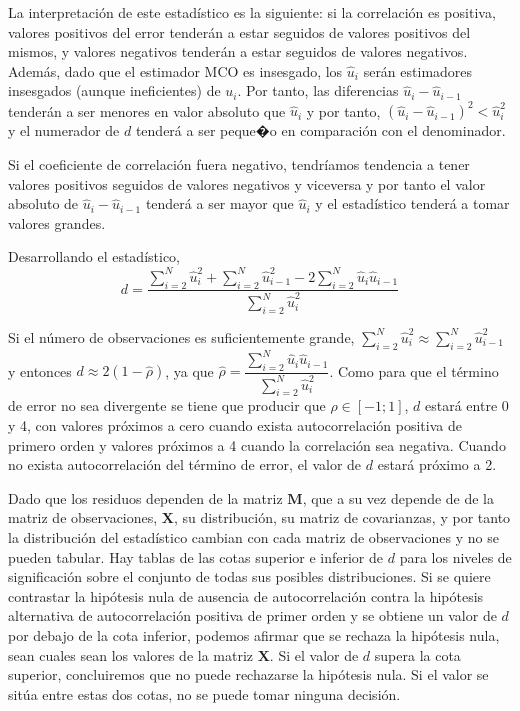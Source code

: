 La interpretaci\'on de este estad\'istico es la siguiente: si la correlaci\'on
es positiva, valores positivos del error tender\'an a estar seguidos
de valores positivos del mismos, y valores negativos tender\'an a estar
seguidos de valores negativos. Adem\'as, dado que el estimador MCO es
insesgado, los $\hat{u}_{i}$ ser\'an estimadores insesgados (aunque
ineficientes) de $u_{i}$. Por tanto, las diferencias $\hat{u}_{i}-\hat{u}_{i-1}$
tender\'an a ser menores en valor absoluto que $\hat{u}_{i}$ y por
tanto, $\left(\hat{u}_{i}-\hat{u}_{i-1}\right)^{2}<\hat{u}_{i}^{2}$
y el numerador de $d$ tender\'a a ser peque�o en comparaci\'on con el
denominador.

Si el coeficiente de correlaci\'on fuera negativo, tendr\'iamos tendencia
a tener valores positivos seguidos de valores negativos y viceversa
y por tanto el valor absoluto de $\hat{u}_{i}-\hat{u}_{i-1}$ tender\'a
a ser mayor que $\hat{u}_{i}$ y el estad\'istico tender\'a a tomar valores
grandes.

Desarrollando el estad\'istico, 
\[
d=\dfrac{\sum_{i=2}^{N}\hat{u}_{i}^{2}+\sum_{i=2}^{N}\hat{u}_{i-1}^{2}-2\sum_{i=2}^{N}\hat{u}_{i}\hat{u}_{i-1}}{\sum_{i=2}^{N}\hat{u}_{i}^{2}}
\]


Si el n\'umero de observaciones es suficientemente grande, $\sum_{i=2}^{N}\hat{u}_{i}^{2}\approx\sum_{i=2}^{N}\hat{u}_{i-1}^{2}$
y entonces $d\approx2\left(1-\hat{\rho}\right)$, ya que $\hat{\rho}=\dfrac{\sum_{i=2}^{N}\hat{u}_{i}\hat{u}_{i-1}}{\sum_{i=2}^{N}\hat{u}_{i}^{2}}$.
Como para que el t\'ermino de error no sea divergente se tiene que producir
que $\rho\in\left[-1;1\right]$, $d$ estar\'a entre 0 y 4, con valores
pr\'oximos a cero cuando exista autocorrelaci\'on positiva de primero
orden y valores pr\'oximos a 4 cuando la correlaci\'on sea negativa. Cuando
no exista autocorrelaci\'on del t\'ermino de error, el valor de $d$ estar\'a
pr\'oximo a 2.

Dado que los residuos dependen de la matriz $\boldsymbol{M}$, que
a su vez depende de de la matriz de observaciones, $\boldsymbol{X}$,
su distribuci\'on, su matriz de covarianzas, y por tanto la distribuci\'on
del estad\'istico cambian con cada matriz de observaciones y no se pueden
tabular. Hay tablas de las cotas superior e inferior de $d$ para
los niveles de significaci\'on sobre el conjunto de todas sus posibles
distribuciones. Si se quiere contrastar la hip\'otesis nula de ausencia
de autocorrelaci\'on contra la hip\'otesis alternativa de autocorrelaci\'on
positiva de primer orden y se obtiene un valor de $d$ por debajo
de la cota inferior, podemos afirmar que se rechaza la hip\'otesis nula,
sean cuales sean los valores de la matriz $\boldsymbol{X}$. Si el
valor de $d$ supera la cota superior, concluiremos que no puede rechazarse
la hip\'otesis nula. Si el valor se sit\'ua entre estas dos cotas, no
se puede tomar ninguna decisi\'on.


